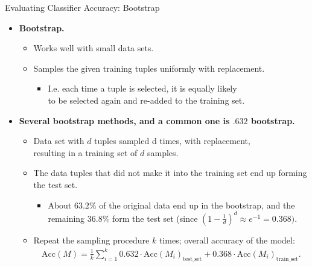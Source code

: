 \begin{frame}{Evaluating Classifier Accuracy: Bootstrap}
	\begin{itemize}
		\item \textbf{Bootstrap.}
		      \begin{itemize}
			      \item Works well with small data sets.
			      \item Samples the given training tuples uniformly with replacement.
			            \begin{itemize}
				            \item I.e. each time a tuple is selected, it is equally likely \\
				                  to be selected again and re-added to the training set.
			            \end{itemize}
		      \end{itemize}
		\item \textbf{Several bootstrap methods, and a common one is $.632$ bootstrap.}
		      \begin{itemize}
			      \item Data set with $d$ tuples sampled d times, with replacement, \\
			            resulting in a training set of $d$ samples.
			      \item The data tuples that did not make it into the training set end up forming the test set.
			            \begin{itemize}
				            \item About $63.2\%$ of the original data end up in the bootstrap, and the remaining $36.8\%$ form the test set (since $(1-\frac{1}{d})^d \approx e^{-1} = 0.368)$.
			            \end{itemize}
			      \item Repeat the sampling procedure $k$ times; overall accuracy of the model:
			            \begin{align}
				            \text{Acc}(M) = \frac{1}{k} \sum_{i=1}^{k} 0.632 \cdot \text{Acc}(M_i)_{\text{test\_set}} + 0.368 \cdot \text{Acc}(M_i)_{\text{train\_set}}.
			            \end{align}
		      \end{itemize}
	\end{itemize}
\end{frame}

